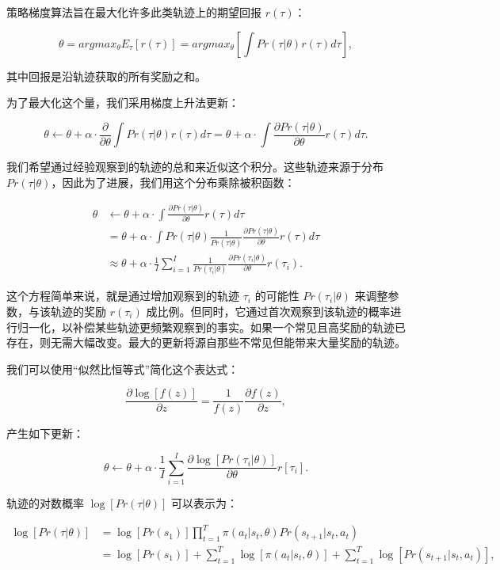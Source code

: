 策略梯度算法旨在最大化许多此类轨迹上的期望回报 \(r(\tau)\)：

\[
\theta = argmax_{\theta} E_{\tau} \left[ r(\tau) \right] = argmax_{\theta} \left[ \int Pr(\tau|\theta)r(\tau) d\tau \right], \tag{19.23}
\]

其中回报是沿轨迹获取的所有奖励之和。

为了最大化这个量，我们采用梯度上升法更新：

\[
\theta \leftarrow \theta + \alpha \cdot \frac{\partial}{\partial \theta} \int Pr(\tau|\theta)r(\tau) d\tau
= \theta + \alpha \cdot \int \frac{\partial Pr(\tau|\theta)}{\partial \theta} r(\tau) d\tau. \tag{19.24}
\]

我们希望通过经验观察到的轨迹的总和来近似这个积分。这些轨迹来源于分布 \(Pr(\tau|\theta)\)，因此为了进展，我们用这个分布乘除被积函数：


\begin{align}
\theta &\leftarrow \theta + \alpha \cdot \int \frac{\partial Pr(\tau|\theta)}{\partial \theta} r(\tau) d\tau \\
&= \theta + \alpha \cdot \int Pr(\tau|\theta) \frac{1}{Pr(\tau|\theta)} \frac{\partial Pr(\tau|\theta)}{\partial \theta} r(\tau) d\tau \\
&\approx \theta + \alpha \cdot \frac{1}{I} \sum_{i=1}^I \frac{1}{Pr(\tau_i|\theta)} \frac{\partial Pr(\tau_i|\theta)}{\partial \theta} r(\tau_i).
\end{align} 



这个方程简单来说，就是通过增加观察到的轨迹 \(\tau_i\) 的可能性 \(Pr(\tau_i|\theta)\) 来调整参数，与该轨迹的奖励 \(r(\tau_i)\) 成比例。但同时，它通过首次观察到该轨迹的概率进行归一化，以补偿某些轨迹更频繁观察到的事实。如果一个常见且高奖励的轨迹已存在，则无需大幅改变。最大的更新将源自那些不常见但能带来大量奖励的轨迹。

我们可以使用“似然比恒等式”简化这个表达式：

\[
\frac{\partial \log[f(z)]}{\partial z} = \frac{1}{f(z)} \frac{\partial f(z)}{\partial z}, \tag{19.26}
\]

产生如下更新：

\[
\theta \leftarrow \theta + \alpha \cdot \frac{1}{I} \sum_{i=1}^{I} \frac{\partial \log [Pr(\tau_i|\theta)]}{\partial \theta} r[\tau_i]. \tag{19.27}
\]

轨迹的对数概率 \(\log[Pr(\tau|\theta)]\) 可以表示为：


\begin{align}
\log[Pr(\tau|\theta)] &= \log [Pr(s_1)] \prod_{t=1}^{T} \pi(a_t|s_t, \theta) Pr(s_{t+1}|s_t, a_t) \\
&= \log [Pr(s_1)] + \sum_{t=1}^{T} \log [\pi(a_t|s_t, \theta)] + \sum_{t=1}^{T} \log [Pr(s_{t+1}|s_t, a_t)],
\end{align} 


